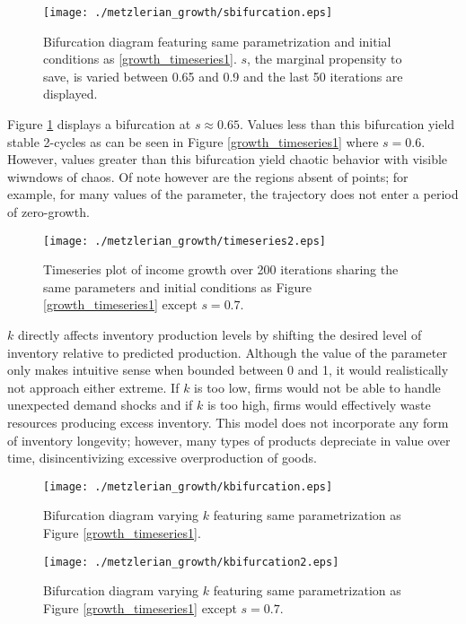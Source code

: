 \begin{figure}
    \centering
    \texttt{[image: ./metzlerian\_growth/sbifurcation.eps]}
    \caption{Bifurcation diagram featuring same parametrization and initial conditions as \ref{growth_timeseries1}. $s$, the marginal propensity to save, is varied between 0.65 and 0.9 and the last 50 iterations are displayed. }
    \label{growth_sbifurcation}
\end{figure}
Figure \ref{growth_sbifurcation} displays a bifurcation at $s\approx0.65$. Values less than this bifurcation yield stable 2-cycles as can be seen in Figure \ref{growth_timeseries1} where $s=0.6$. However, values greater than this bifurcation yield chaotic behavior with visible wiwndows of chaos. Of note however are the regions absent of points; for example, for many values of the parameter, the trajectory does not enter a period of zero-growth.
\begin{figure}
    \centering
    \texttt{[image: ./metzlerian\_growth/timeseries2.eps]}
    \caption{Timeseries plot of income growth over 200 iterations sharing the same parameters and initial conditions as Figure \ref{growth_timeseries1} except $s=0.7$.}
    \label{growth_timeseries2}
\end{figure}

$k$ directly affects inventory production levels by shifting the desired level of inventory relative to predicted production. Although the value of the parameter only makes intuitive sense when bounded between 0 and 1, it would realistically not approach either extreme. If $k$ is too low, firms would not be able to handle unexpected demand shocks and if $k$ is too high, firms would effectively waste resources producing excess inventory. This model does not incorporate any form of inventory longevity; however, many types of products depreciate in value over time, disincentivizing excessive overproduction of goods.

\begin{figure}
    \centering
    \texttt{[image: ./metzlerian\_growth/kbifurcation.eps]}
    \caption{Bifurcation diagram varying $k$ featuring same parametrization as Figure \ref{growth_timeseries1}.}
    \label{growth_kbifurcation}
\end{figure}

\begin{figure}
    \centering
    \texttt{[image: ./metzlerian\_growth/kbifurcation2.eps]}
    \caption{Bifurcation diagram varying $k$ featuring same parametrization as Figure \ref{growth_timeseries1} except $s=0.7$. }
    \label{growth_kbifurcation2}
\end{figure}

